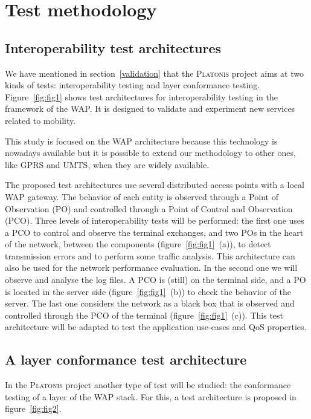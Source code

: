 \section{Test methodology}
\subsection{Interoperability test architectures}

We have mentioned in section~\ref{validation} that the \textsc{Platonis}
project aims at two kinds of tests: interoperability
testing and layer conformance testing. Figure~\ref{fig:fig1} shows test
architectures for interoperability testing in the
framework of the WAP. It is designed to validate and experiment new
services related to mobility.

This study is focused on the WAP architecture because this technology
is nowadays available but it is possible to extend our methodology to
other ones, like GPRS and UMTS, when they are widely available.

The proposed test architectures use several distributed access points
with a local WAP gateway. The behavior of each entity is
observed through a Point of Observation (PO) and controlled through a
Point of Control and Observation (PCO). Three levels of
interoperability tests will be performed: the first one uses a PCO to
control and observe the terminal exchanges, and two POs in the heart of
the network, between the components (figure~\ref{fig:fig1}~(a)), to
detect transmission errors and to perform some traffic analysis.
This architecture can also be used for the network performance
evaluation. In the second one we will observe and analyse the log
files. A PCO is (still) on the terminal side, and a PO is located in
the server side (figure~\ref{fig:fig1}~(b)) to check the behavior of
the server. The last one considers the network as a black box that is
observed and controlled through the PCO of the terminal
(figure~\ref{fig:fig1}~(c)). This test architecture will be adapted to
test the application use-cases and QoS properties.


\subsection{A layer conformance test architecture}

In the \textsc{Platonis} project another type of test will be studied:
the conformance testing of a layer of the WAP stack. For this, a
test architecture is proposed in figure~\ref{fig:fig2}.

